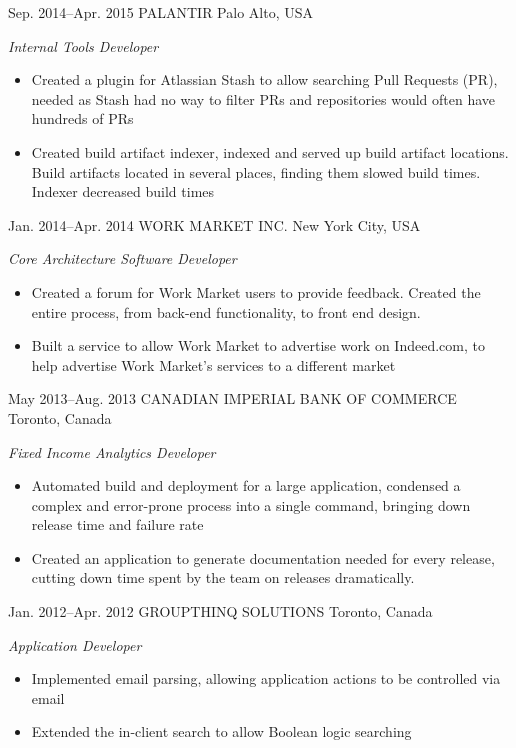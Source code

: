 \documentclass[]{friggeri-cv} %
\begin{document}
\begin{sectionlist}
	\entry
	{Sep. 2014--Apr. 2015}
	{PALANTIR}
	{Palo Alto, USA}
	{\emph{Internal Tools Developer} \\
		\begin{itemize}
			\item Created a plugin for Atlassian Stash to allow searching Pull Requests (PR), needed as Stash had no way to filter PRs and repositories would often have hundreds of PRs
			\item Created build artifact indexer, indexed  and served up build artifact locations. Build artifacts located in several places, finding them slowed build times. Indexer decreased build times
		\end{itemize}
	}
	
	\entry
	{Jan. 2014--Apr. 2014}
	{WORK MARKET INC.}
	{New York City, USA}
	{\emph{Core Architecture Software Developer } \\
		\begin{itemize}
			\item Created a forum for Work Market users to provide feedback. Created the entire process, from back-end functionality, to front end design.
			\item Built a service to allow Work Market to advertise work on Indeed.com, to help advertise Work Market's services to a different market
		\end{itemize}
	}
	
	\entry
	{May 2013--Aug. 2013}
	{CANADIAN IMPERIAL BANK OF COMMERCE}
	{Toronto, Canada}
	{\emph{Fixed Income Analytics Developer} \\
		\begin{itemize}
			\item Automated build and deployment for a large application, condensed a complex and error-prone process into a single command, bringing down release time and failure rate
			\item Created an application to generate documentation needed for every release, cutting down time spent by the team on releases dramatically.
		\end{itemize}
	}
		
	\entry
	{Jan. 2012--Apr. 2012}
	{GROUPTHINQ SOLUTIONS}
	{Toronto, Canada}
	{\emph{Application Developer} \\
		\begin{itemize}
			\item Implemented email parsing, allowing application actions to be controlled via email	
			\item Extended the in-client search to allow Boolean logic searching
		\end{itemize}
	}
\end{sectionlist}
\end{document}
